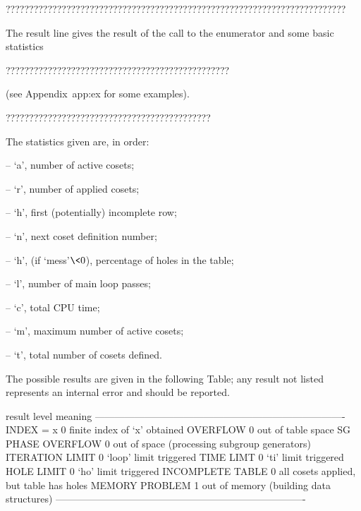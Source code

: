 ?????????????????????????????????????????????????????????????????????????

The result line gives the result of the call to the enumerator and some
basic statistics 

????????????????????????????????????????????????

(see Appendix~{app:ex} for some examples).

????????????????????????????????????????????



The statistics given are, in order: 
 
\beginlist
\item{--}  `a', number of active cosets; 
\item{--}  `r', number of applied cosets;
\item{--}  `h', first (potentially) incomplete row;
\item{--}  `n', next coset definition number; 
\item{--}  `h', (if `mess'$ \< 0$), percentage of holes in the table;
\item{--}  `l', number of main loop passes;
\item{--}  `c', total CPU time;
\item{--}  `m', maximum number of active cosets;
\item{--}  `t', total number of cosets defined.
\endlist

The possible results are given in the following Table; any result not
listed represents an internal error and should be reported.

\begintt
result               level     meaning 
----------------------------------------------------------------------------
INDEX = x                0     finite index of `x' obtained
OVERFLOW                 0     out of table space
SG PHASE OVERFLOW        0     out of space (processing subgroup generators)
ITERATION LIMIT          0     `loop' limit triggered
TIME LIMT                0     `ti' limit triggered
HOLE LIMIT               0     `ho' limit triggered
INCOMPLETE TABLE         0     all cosets applied, but table has holes
MEMORY PROBLEM           1     out of memory (building data structures)
----------------------------------------------------------------------------
\endtt


